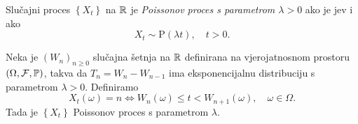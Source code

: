 \documentclass[main.tex]{subfiles}
\begin{document}
\begin{definicija}
	Slučajni proces \( \left\{ X_t \right\} \) na \( \R \) je \emph{Poissonov proces s parametrom \( \lambda > 0\)} ako je \levy jev i ako
	\begin{equation} \label{eq:poispois}
		X_t \sim \mathrm{P}(\lambda t), \quad t > 0.
	\end{equation}
\end{definicija}

\begin{teorem}
	Neka je \( (W_n)_{n \ge 0} \) slučajna šetnja na \( \R \) definirana na vjerojatnosnom prostoru
	\( (\Omega, \mathcal F, \P) \), takva da \( T_n = W_n - W_{n-1} \) ima eksponencijalnu distribuciju
	s parametrom \( \lambda > 0 \). Definiramo
	\begin{equation}\label{eq:poiscons}
		X_t(\omega) = n \iff W_n(\omega) \le t < W_{n+1}(\omega), \quad \omega \in \Omega.
	\end{equation}
	Tada je \( \left\{ X_t \right\} \) Poissonov proces s parametrom \( \lambda \).
\end{teorem}
\end{document}
